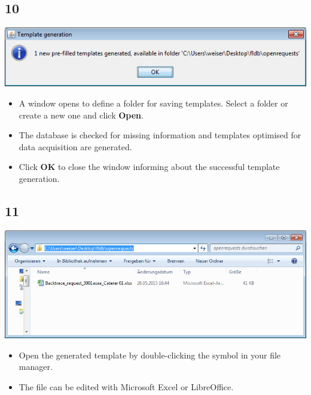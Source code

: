 \documentclass{beamer}
\begin{document}
\subsection{10}
\begin{frame}
	\begin{center}
  		\includegraphics[height=0.2\textheight]{10.png}
	\end{center}
	\begin{itemize}
		\item A window opens to define a folder for saving templates. Select a folder or create a new one and click \textbf{Open}.
		\item The database is checked for missing information and templates optimised for data acquisition are generated.
		\item Click \textbf{OK} to close the window informing about the successful template generation.
	\end{itemize}
\end{frame}

\subsection{11}
\begin{frame}
	\begin{center}
  		\includegraphics[height=0.4\textheight]{11.png}
	\end{center} 	
	\begin{itemize}
		\item Open the generated template by double-clicking the symbol in your file manager.
		\item The file can be edited with Microsoft Excel or LibreOffice.
	\end{itemize}
\end{frame}
\end{document}
